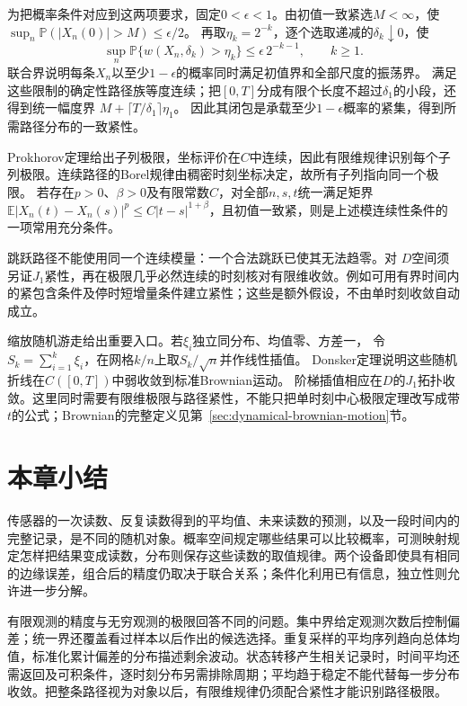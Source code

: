 为把概率条件对应到这两项要求，固定\(0<\epsilon<1\)。由初值一致紧选\(M<\infty\)，使
\(\sup_n\mathbb P(|X_n(0)|>M)\leq\epsilon/2\)。
再取\(\eta_k=2^{-k}\)，逐个选取递减的\(\delta_k\downarrow0\)，使
\[
 \sup_n\mathbb P\{w(X_n,\delta_k)>\eta_k\}
 \leq\epsilon\,2^{-k-1},\qquad k\geq1.
\]
联合界说明每条\(X_n\)以至少\(1-\epsilon\)的概率同时满足初值界和全部尺度的振荡界。
满足这些限制的确定性路径族等度连续；把\([0,T]\)分成有限个长度不超过\(\delta_1\)的小段，还得到统一幅度界
\(M+\lceil T/\delta_1\rceil\eta_1\)。
因此其闭包是承载至少\(1-\epsilon\)概率的紧集，得到所需路径分布的一致紧性。

Prokhorov定理给出子列极限，坐标评价在\(C\)中连续，因此有限维规律识别每个子列极限。连续路径的Borel规律由稠密时刻坐标决定，故所有子列指向同一个极限。
若存在\(p>0\)、\(\beta>0\)及有限常数\(C\)，对全部\(n,s,t\)统一满足矩界
\(\mathbb E|X_n(t)-X_n(s)|^p\leq C|t-s|^{1+\beta}\)，且初值一致紧，则是上述模连续性条件的一项常用充分条件。

跳跃路径不能使用同一个连续模量：一个合法跳跃已使其无法趋零。对
\(D\)空间须另证\(J_1\)紧性，再在极限几乎必然连续的时刻核对有限维收敛。例如可用有界时间内的紧包含条件及停时短增量条件建立紧性；这些是额外假设，不由单时刻收敛自动成立。

缩放随机游走给出重要入口。若\(\xi_i\)独立同分布、均值零、方差一，
令\(S_k=\sum_{i=1}^k\xi_i\)，在网格\(k/n\)上取\(S_k/\sqrt n\)并作线性插值。
Donsker定理说明这些随机折线在\(C([0,T])\)中弱收敛到标准Brownian运动。
阶梯插值相应在\(D\)的\(J_1\)拓扑收敛。这里同时需要有限维极限与路径紧性，不能只把单时刻中心极限定理改写成带\(t\)的公式；Brownian的完整定义见第~\ref{sec:dynamical-brownian-motion}节。

\section{本章小结}
\label{sec:probability-summary}
\label{sec:stochastic-processes-and-approximation-summary}
\label{sec:statistics-summary}

传感器的一次读数、反复读数得到的平均值、未来读数的预测，以及一段时间内的完整记录，是不同的随机对象。概率空间规定哪些结果可以比较概率，可测映射规定怎样把结果变成读数，分布则保存这些读数的取值规律。两个设备即使具有相同的边缘误差，组合后的精度仍取决于联合关系；条件化利用已有信息，独立性则允许进一步分解。

有限观测的精度与无穷观测的极限回答不同的问题。集中界给定观测次数后控制偏差；统一界还覆盖看过样本以后作出的候选选择。重复采样的平均序列趋向总体均值，标准化累计偏差的分布描述剩余波动。状态转移产生相关记录时，时间平均还需返回及可积条件，逐时刻分布另需排除周期；平均趋于稳定不能代替每一步分布收敛。把整条路径视为对象以后，有限维规律仍须配合紧性才能识别路径极限。

